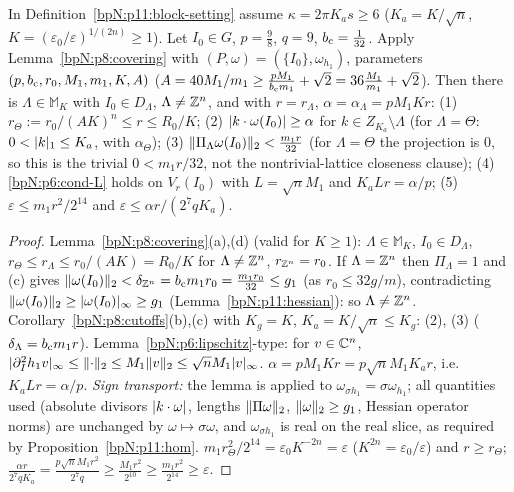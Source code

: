 \begin{lemma}\label{bpN:p11:block-data}
In Definition~\ref{bpN:p11:block-setting} assume $\kappa=2\pi K_as\ge6$ ($K_a=K/\sqrt n$, $K=(\varepsilon_0/\varepsilon)^{1/(2n)}\ge1$). Let $I_0\in G$, $p=\frac98$, $q=9$, $b_{\rm c}=\frac1{32}$. Apply Lemma~\ref{bpN:p8:covering} with $(P,\omega)=(\{I_0\},\omega_{h_1})$, parameters $(p,b_{\rm c},r_0,M_1,m_1,K,A)$ ($A=40M_1/m_1\ge\frac{pM_1}{b_{\rm c}m_1}+\sqrt2=36\frac{M_1}{m_1}+\sqrt2$). Then there is $\Lambda\in\mathbb M_K$ with $I_0\in D_\Lambda$, $\Lambda\ne\mathbb{Z}^n$, and with $r=r_\Lambda$, $\alpha=\alpha_\Lambda=pM_1Kr$:
(1) $r_\Theta:=r_0/(AK)^n\le r\le R_0/K$; (2) $\lvert k\cdot\omega(I_0)\rvert\ge\alpha$ for $k\in Z_{K_a}\setminus\Lambda$ (for $\Lambda=\Theta$: $0<\lvert k\rvert_1\le K_a$, with $\alpha_\Theta$); (3) $\lVert \Pi_\Lambda\omega(I_0)\rVert_2<\frac{m_1r}{32}$ (for $\Lambda=\Theta$ the projection is $0$, so this is the trivial $0<m_1r/32$, not the nontrivial-lattice closeness clause); (4) \ref{bpN:p6:cond-L} holds on $V_r(I_0)$ with $L=\sqrt nM_1$ and $K_aLr=\alpha/p$; (5) $\varepsilon\le m_1r^2/2^{14}$ and $\varepsilon\le\alpha r/(2^7qK_a)$.
\end{lemma}
\begin{proof}
\label{stepN:p11:bd-cover} Lemma~\ref{bpN:p8:covering}(a),(d) (valid for $K\ge1$): $\Lambda\in\mathbb M_K$, $I_0\in D_\Lambda$, $r_\Theta\le r_\Lambda\le r_0/(AK)=R_0/K$ for $\Lambda\ne\mathbb{Z}^n$, $r_{\mathbb{Z}^n}=r_0$. If $\Lambda=\mathbb{Z}^n$ then $\Pi_\Lambda=1$ and (c) gives $\lVert \omega(I_0)\rVert_2<\delta_{\mathbb{Z}^n}=b_{\rm c}m_1r_0=\frac{m_1r_0}{32}\le g_1$ (as $r_0\le32g/m$), contradicting $\lVert \omega(I_0)\rVert_2\ge\lvert \omega(I_0)\rvert_\infty\ge g_1$ (Lemma~\ref{bpN:p11:hessian}): so $\Lambda\ne\mathbb{Z}^n$.
\label{stepN:p11:bd-24} Corollary~\ref{bpN:p8:cutoffs}(b),(c) with $K_g=K$, $K_a=K/\sqrt n\le K_g$: (2), (3) ($\delta_\Lambda=b_{\rm c}m_1r$). Lemma~\ref{bpN:p6:lipschitz}-type: for $v\in\mathbb{C}^n$, $\lvert \partial_I^2h_1v\rvert_\infty\le\lVert \cdot\rVert_2\le M_1\lVert v\rVert_2\le\sqrt nM_1\lvert v\rvert_\infty$. $\alpha=pM_1Kr=p\sqrt nM_1K_ar$, i.e.\ $K_aLr=\alpha/p$. \emph{Sign transport:} the lemma is applied to $\omega_{\sigma h_1}=\sigma\omega_{h_1}$; all quantities used (absolute divisors $\lvert k\cdot\omega\rvert$, lengths $\lVert \Pi\omega\rVert_2$, $\lVert \omega\rVert_2\ge g_1$, Hessian operator norms) are unchanged by $\omega\mapsto\sigma\omega$, and $\omega_{\sigma h_1}$ is real on the real slice, as required by Proposition~\ref{bpN:p11:hom}.
\label{stepN:p11:bd-5} $m_1r_\Theta^2/2^{14}=\varepsilon_0K^{-2n}=\varepsilon$ ($K^{2n}=\varepsilon_0/\varepsilon$) and $r\ge r_\Theta$; $\frac{\alpha r}{2^7qK_a}=\frac{p\sqrt nM_1r^2}{2^7q}\ge\frac{M_1r^2}{2^{10}}\ge\frac{m_1r^2}{2^{14}}\ge\varepsilon$.
\end{proof}

